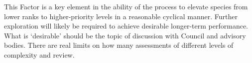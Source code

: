 \documentclass[11pt,
  english,
  a4paper,
]{article}
\begin{document}
\leavevmode\tagmcend\tagstructend\par


This Factor is a key element in the ability of the process to elevate species from lower ranks to higher-priority levels in a reasonable cyclical manner. Further exploration will likely be required to achieve desirable longer-term performance. What is `desirable' should be the topic of discussion with Council and advisory bodies. There are real limits on how many assessments of different levels of complexity and review.

\leavevmode\tagmcend\tagstructend\par

\begingroup\fontsize{10}{12}\selectfont
\begingroup\fontsize{10}{12}\selectfont
\end{document}
